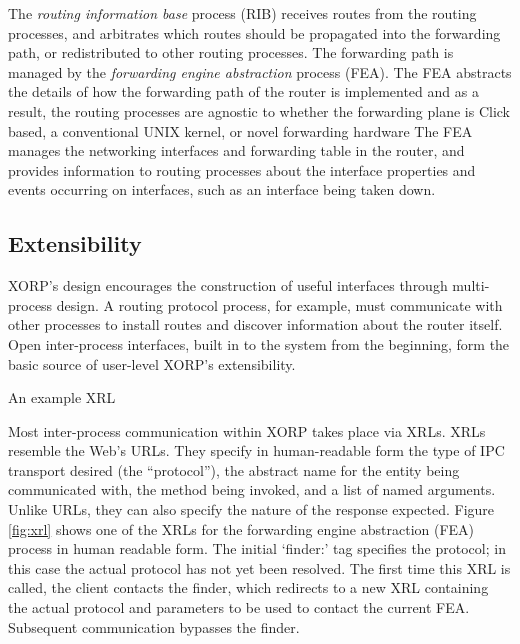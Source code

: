 
The \emph{routing information base} process (RIB) receives routes from
the routing processes, and arbitrates which routes should be
propagated into the forwarding path, or redistributed to other routing
processes.  The forwarding path is managed
by the \emph{forwarding engine abstraction} process (FEA).  The FEA
abstracts the details of how the forwarding path of the router is
implemented and as a result, the routing processes are agnostic to
whether the forwarding plane is Click \cite{click} based, a conventional UNIX
kernel, or novel forwarding hardware  The FEA manages the networking
interfaces and forwarding table in the router, and provides information to routing processes
about the interface properties and events occurring on interfaces, such as an
interface being taken down.


\subsection{Extensibility}

XORP's design encourages the construction of useful
interfaces through multi-process design.
A routing protocol process, for example, must communicate with other
processes to install routes and discover information about the router
itself.
Open inter-process interfaces, built in to the system from the beginning,
form the basic source of user-level XORP's extensibility.

%
\begin{floatingfigure}[r]{3.3in} %
\centerline{}
\caption{An example XRL}
\label{fig:xrl}
\vspace{-0.1in}
\end{floatingfigure}

\def\xrl#1{\textsf{\small #1}} Most inter-process communication within
XORP takes place via XRLs.  XRLs resemble the Web's URLs. They specify
in human-readable form the type of IPC transport desired (the
``protocol''), the abstract name for the entity being communicated
with, the method being invoked, and a list of named arguments.  Unlike
URLs, they can also specify the nature of the response expected.
Figure \ref{fig:xrl} shows one of the XRLs for
the forwarding engine abstraction (FEA) process in
human readable form. The initial `\xrl{finder:}' tag specifies the
protocol; in this case the actual protocol has not yet been resolved.
The first time this XRL is called, the client contacts the
finder, which redirects to a new XRL containing the
actual protocol and parameters to be used to
contact the current FEA.  Subsequent communication bypasses the finder.

